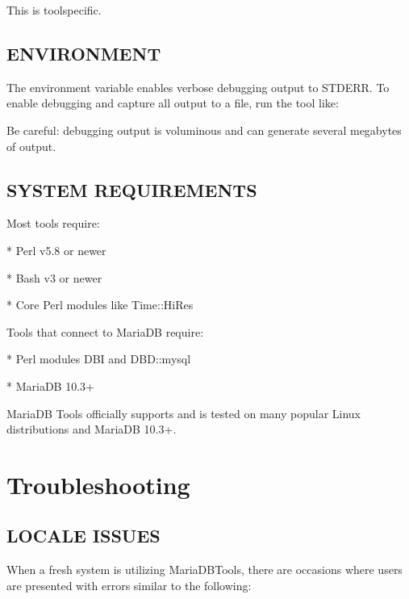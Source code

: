 \documentclass[letterpaper,10pt,english]{sphinxmanual}
\begin{document}
This is tool\sphinxhyphen{}specific.


\chapter{ENVIRONMENT}
\label{\detokenize{environment:environment}}\label{\detokenize{environment::doc}}
The environment variable  enables verbose debugging output to STDERR.
To enable debugging and capture all output to a file, run the tool like:

\begin{sphinxVerbatim}[commandchars=\\\{\}]
     
\end{sphinxVerbatim}

Be careful: debugging output is voluminous and can generate several megabytes
of output.


\chapter{SYSTEM REQUIREMENTS}
\label{\detokenize{system_requirements:system-requirements}}\label{\detokenize{system_requirements::doc}}
Most tools require:

* Perl v5.8 or newer

* Bash v3 or newer

* Core Perl modules like Time::HiRes

Tools that connect to MariaDB require:

* Perl modules DBI and DBD::mysql

* MariaDB 10.3+

MariaDB Tools officially supports and is tested on many popular Linux
distributions and MariaDB 10.3+.


\part{Troubleshooting}
\label{\detokenize{index:troubleshooting}}

\chapter{LOCALE ISSUES}
\label{\detokenize{locale_issues:locale-issues}}\label{\detokenize{locale_issues::doc}}
When a fresh system is utilizing MariaDB\sphinxhyphen{}Tools, there are occasions where users
are presented with errors similar to the following:
\end{document}
